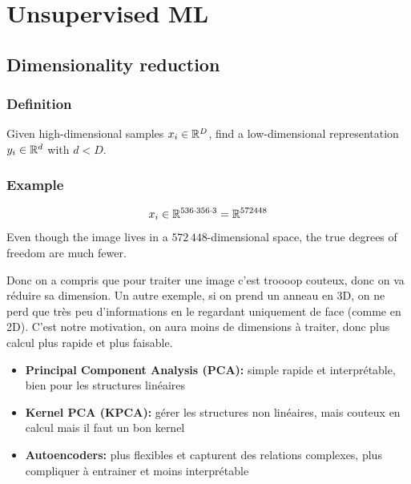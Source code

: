 \documentclass[11pt,a4paper,openany]{book}
\begin{document}
\chapter{Unsupervised ML}

\section{Dimensionality reduction}

\subsection{Definition}

\begin{defnbox}[title=Dimensionality Reduction]
Given high-dimensional samples \(x_i \in \mathbb{R}^D\), find a low-dimensional representation \(y_i \in \mathbb{R}^d\) with \(d < D\).
\end{defnbox}

\subsection{Example}

\begin{exbox}[title=Image vectorization]
\[
x_i \in \mathbb{R}^{536 \cdot 356 \cdot 3} = \mathbb{R}^{572448}
\]
Even though the image lives in a $572\,448$-dimensional space, the true degrees of freedom are much fewer.
\end{exbox}

Donc on a compris que pour traiter une image c'est troooop couteux, donc on va réduire sa dimension. Un autre exemple, si on prend un anneau en 3D, on ne perd que très peu d'informations en le regardant uniquement de face (comme en 2D). C'est notre motivation, on aura moins de dimensions à traiter, donc plus calcul plus rapide et plus faisable. 
\begin{itemize}
    \item \textbf{Principal Component Analysis (PCA):} simple rapide et interprétable, bien pour les structures linéaires
    \item \textbf{Kernel PCA (KPCA):}  gérer les structures non linéaires, mais couteux en calcul mais il faut un bon kernel
    \item \textbf{Autoencoders:} plus flexibles et capturent des relations complexes, plus compliquer à entrainer et moins interprétable
\end{itemize}
\end{document}
